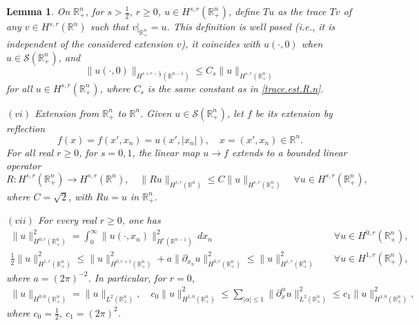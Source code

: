 \documentclass[10pt,reqno,a4paper]{article}
\numberwithin{equation}{section}
\theoremstyle{plain}
\newtheorem{lemma}[theorem]{Lemma}
\theoremstyle{definition}
\newcommand{\R}{{\mathbb R}}
\newcommand{\mS}{\mathcal{S}}
\renewcommand{\a}{\alpha}
\newcommand{\pa}{\partial}
\begin{document}
\begin{lemma}
On $\R^n_+$, for $s>\frac12$, $r \geq 0$, 
$u \in H^{s,r}(\R^n_+)$, define $Tu$ as the trace $Tv$ of any $v \in H^{s,r}(\R^n)$ 
such that $v|_{\R^n_+} = u$.  
This definition is well posed (i.e., it is independent of the considered extension $v$),   
it coincides with $u(\cdot, 0)$ when $u \in \mS(\R^n_+)$, and 
\begin{equation} \label{trace.est}
\| u(\cdot , 0) \|_{ H^{s+r-\frac12}(\R^{n-1}) } 
\leq C_s \| u \|_{ H^{s,r}(\R^n_+) }
\end{equation}
for all $u \in H^{s,r}(\R^n_+)$, where $C_s$ is the same constant as in \eqref{trace.est.R.n}.

$(vi)$ \emph{Extension from $\R^n_+$ to $\R^n$}. 
Given $u \in \mS(\R^n_+)$, let $f$ be its extension by reflection 
\begin{equation} \label{def.reflex}
f(x) = f(x', x_n) = u(x',|x_n|), \quad x = (x',x_n) \in \R^n.
\end{equation}
For all real $r \geq 0$, for $s = 0,1$, 
the linear map $u \to f$ extends to a bounded linear operator 
\begin{equation} \label{reflex.est}
R : H^{s,r}(\R^n_+) \to H^{s,r}(\R^n), \quad 
\| Ru \|_{H^{s,r}(\R^n)} \leq C \| u \|_{H^{s,r}(\R^n_+)} 
\quad \forall u \in H^{s,r}(\R^n_+),
\end{equation}
where $C = \sqrt{2}$, 
with $Ru = u$ in $\R^n_+$. 

$(vii)$ For every real $r \geq 0$, one has 
\begin{align} 
\| u \|_{H^{0,r}(\R^n_+)}^2 
= \int_0^\infty \| u(\cdot, x_n) \|_{H^r(\R^{n-1})}^2 \, dx_n
\quad & \forall u \in H^{0,r}(\R^n_+),
\label{equiv.norm.H.0.r}
\\
\frac12 \| u \|_{H^{1,r}(\R^n_+)}^2 
\leq \| u \|_{H^{0,r+1}(\R^n_+)}^2 + a \| \pa_{x_n} u \|_{H^{0,r}(\R^n_+)}^2 
\leq \| u \|_{H^{1,r}(\R^n_+)}^2 
\quad & \forall u \in H^{1,r}(\R^n_+),
\label{equiv.norm.H.1.r}
\end{align}
where $a = (2\pi)^{-2}$. 
In particular, for $r=0$, 
\begin{align} 
\| u \|_{H^{0,0}(\R^n_+)} 
= \| u \|_{L^2(\R^n_+)}, 
\quad
c_0 \| u \|_{H^{1,0}(\R^n_+)}^2 
\leq \sum_{|\a| \leq 1} \| \pa_x^\a u \|_{L^2(\R^n_+)}^2 
\leq c_1 \| u \|_{H^{1,0}(\R^n_+)}^2, 
\label{equiv.norm.H.r.zero}
\end{align}
where $c_0 = \frac12$, $c_1 = (2\pi)^2$. 


\end{lemma}
\end{document}

